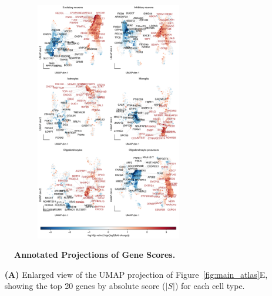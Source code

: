 \documentclass[12pt]{article}
\begin{document}
\begin{figure}[H]
    \begin{subfigure}[t]{1\textwidth}
        \caption{}
        \centering
        \includegraphics[width=0.7\textwidth]{./extended_plots/umap_projection_more_genes.png}        
    \end{subfigure}    
    \caption{
        \textbf{Annotated Projections of Gene Scores.}\\
    }
    \label{fig:snRNAseq_gene_scores}
\end{figure}

\begin{itemize}
    \item[\textbf{(A)}] Enlarged view of the UMAP projection of Figure~\ref{fig:main_atlas}E, showing the top 20 genes by absolute score ($|S|$) for each cell type. 
\end{itemize}
 \clearpage
\end{document}
